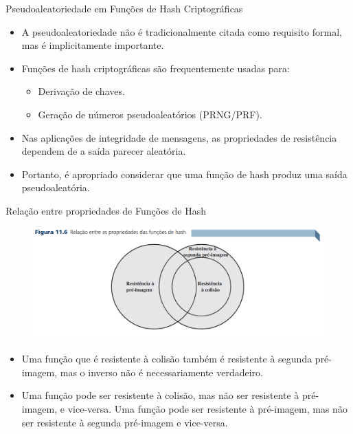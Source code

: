 \begin{frame}{Pseudoaleatoriedade em Funções de Hash Criptográficas}
    \begin{itemize}
        \item A pseudoaleatoriedade não é tradicionalmente citada como requisito formal, mas é implicitamente importante.
        \item Funções de hash criptográficas são frequentemente usadas para:
        \begin{itemize}
            \item Derivação de chaves.
            \item Geração de números pseudoaleatórios (PRNG/PRF).
        \end{itemize}
        \item Nas aplicações de integridade de mensagens, as propriedades de resistência dependem de a saída parecer aleatória.
        \item Portanto, é apropriado considerar que uma função de hash produz uma saída pseudoaleatória.
    \end{itemize}
\end{frame}

\begin{frame}{Relação entre propriedades de Funções de Hash}
    
\begin{figure}
    \centering
    \includegraphics[width=0.9\linewidth]{Figuras/relacao-entre-propriedades-hash.png}

\end{figure}
\begin{itemize}


    \item  Uma função que é resistente à colisão também é resistente à segunda pré-imagem, mas o inverso não é necessariamente verdadeiro.
    \item Uma função pode ser resistente à colisão, mas não ser resistente à pré-imagem, e vice-versa. Uma função pode ser resistente à pré-imagem, mas não ser resistente à segunda pré-imagem e vice-versa.
    \end{itemize}
\end{frame}


